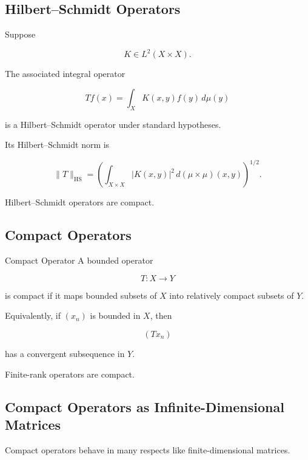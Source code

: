 \subsection{Hilbert--Schmidt Operators}
\label{subsec:hilbert-schmidt-operators}

Suppose

\[
K\in L^2(X\times X).
\]

The associated integral operator

\[
Tf(x)
=
\int_XK(x,y)f(y)\,d\mu(y)
\]

is a Hilbert--Schmidt operator under standard hypotheses.

Its Hilbert--Schmidt norm is

\[
\boxed{
\|T\|_{\mathrm{HS}}
=
\left(
\int_{X\times X}
|K(x,y)|^2
\,d(\mu\times\mu)(x,y)
\right)^{1/2}.
}
\]

Hilbert--Schmidt operators are compact.

\subsection{Compact Operators}
\label{subsec:compact-operators}

\begin{definitionbox}{Compact Operator}
A bounded operator

\[
T:X\to Y
\]

is compact if it maps bounded subsets of \(X\) into relatively compact
subsets of \(Y\).
\end{definitionbox}

Equivalently, if \((x_n)\) is bounded in \(X\), then

\[
(Tx_n)
\]

has a convergent subsequence in \(Y\).

Finite-rank operators are compact.

\subsection{Compact Operators as Infinite-Dimensional Matrices}
\label{subsec:compact-matrix-analogy}

Compact operators behave in many respects like finite-dimensional
matrices.

